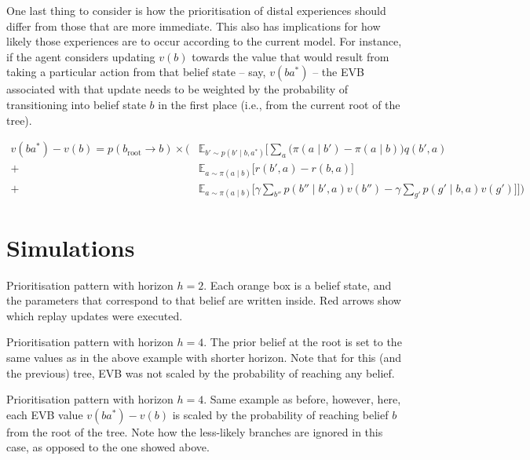 \documentclass{article}
\begin{document}
One last thing to consider is how the prioritisation of distal experiences should 
differ from those that are more immediate. This also has implications for how likely 
those experiences are to occur according to the current model. 
\bigbreak
For instance, if the agent considers updating $v(b)$ towards the value that would result 
from taking a particular action from that belief state -- say, $v(ba^*)$ -- the EVB associated 
with that update needs to be weighted by the probability of transitioning into 
belief state $b$ in the first place (i.e., from the current root of the tree).

\begin{align}
    v(ba^*)-v(b) = p(b_{\text{root}}\rightarrow b) \times  
    \Big(&\mathbb{E}_{b'\sim p(b'\mid b, a^*)}\Big[\sum_a \big(\pi(a\mid b')-\pi(a\mid b)\big)q(b',a) \\
    +& \mathbb{E}_{a\sim \pi(a\mid b)}\big[r(b',a) - r(b,a)\big] \nonumber \\ 
    +& \mathbb{E}_{a\sim \pi(a\mid b)}\big[\gamma \sum_{b''}p(b''\mid b', a)v(b'') - \gamma \sum_{g'}p(g'\mid b, a)v(g') \big] \Big] \Big) \nonumber
\end{align}

\newpage
\section*{Simulations}

Prioritisation pattern with horizon $h=2$. Each orange box is a belief state, and 
the parameters that correspond to that belief are written inside. Red arrows show 
which replay updates were executed.
\vspace{1cm}



\newpage
Prioritisation pattern with horizon $h=4$. The prior belief at the root is set to the 
same values as in the above example with shorter horizon. Note that for this (and the 
previous) tree, EVB was not scaled by the probability of reaching any belief.
\vspace{1cm}



\newpage
Prioritisation pattern with horizon $h=4$. Same example as before, however, here, each 
EVB value $v(ba^*)-v(b)$ is scaled by the probability of reaching belief $b$ from the root 
of the tree. Note how the less-likely branches are ignored in this case, as opposed to the 
one showed above.
\vspace{1cm}
\end{document}
